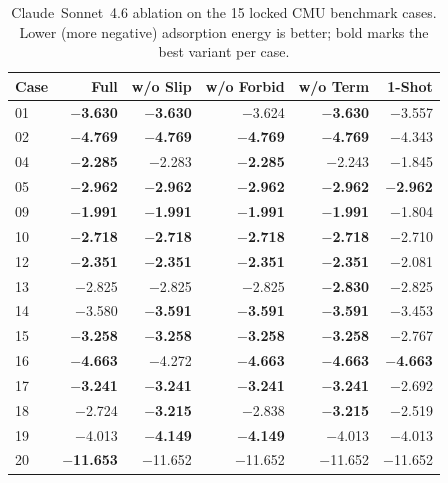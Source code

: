\documentclass[%
 preprint,
 superscriptaddress,
 amsmath,amssymb,
 aps,
 prb,
 floatfix,
]{revtex4-2}
\begin{document}
\begin{table}[ht]
\centering
\small
\caption{Claude~Sonnet~4.6 ablation on the 15 locked CMU benchmark cases. Lower (more negative) adsorption energy is better; bold marks the best variant per case.}
\label{tab:si-ablation-claude}
\begin{tabular}{lrrrrr}
\toprule
Case & Full & w/o Slip & w/o Forbid & w/o Term & 1-Shot \\
\midrule
01 & \textbf{$-$3.630} & \textbf{$-$3.630} & $-$3.624 & \textbf{$-$3.630} & $-$3.557 \\
02 & \textbf{$-$4.769} & \textbf{$-$4.769} & \textbf{$-$4.769} & \textbf{$-$4.769} & $-$4.343 \\
04 & \textbf{$-$2.285} & $-$2.283 & \textbf{$-$2.285} & $-$2.243 & $-$1.845 \\
05 & \textbf{$-$2.962} & \textbf{$-$2.962} & \textbf{$-$2.962} & \textbf{$-$2.962} & \textbf{$-$2.962} \\
09 & \textbf{$-$1.991} & \textbf{$-$1.991} & \textbf{$-$1.991} & \textbf{$-$1.991} & $-$1.804 \\
10 & \textbf{$-$2.718} & \textbf{$-$2.718} & \textbf{$-$2.718} & \textbf{$-$2.718} & $-$2.710 \\
12 & \textbf{$-$2.351} & \textbf{$-$2.351} & \textbf{$-$2.351} & \textbf{$-$2.351} & $-$2.081 \\
13 & $-$2.825 & $-$2.825 & $-$2.825 & \textbf{$-$2.830} & $-$2.825 \\
14 & $-$3.580 & \textbf{$-$3.591} & \textbf{$-$3.591} & \textbf{$-$3.591} & $-$3.453 \\
15 & \textbf{$-$3.258} & \textbf{$-$3.258} & \textbf{$-$3.258} & \textbf{$-$3.258} & $-$2.767 \\
16 & \textbf{$-$4.663} & $-$4.272 & \textbf{$-$4.663} & \textbf{$-$4.663} & \textbf{$-$4.663} \\
17 & \textbf{$-$3.241} & \textbf{$-$3.241} & \textbf{$-$3.241} & \textbf{$-$3.241} & $-$2.692 \\
18 & $-$2.724 & \textbf{$-$3.215} & $-$2.838 & \textbf{$-$3.215} & $-$2.519 \\
19 & $-$4.013 & \textbf{$-$4.149} & \textbf{$-$4.149} & $-$4.013 & $-$4.013 \\
20 & \textbf{$-$11.653} & $-$11.652 & $-$11.652 & $-$11.652 & $-$11.652 \\
\bottomrule
\end{tabular}
\end{table}
\end{document}
